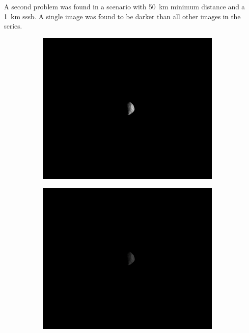 A second problem was found in a scenario with \SI{50}{\kilo\meter} minimum distance and a \SI{1}{\kilo\meter} \gls{sssb}. A single image was found to be darker than all other images in the series.

\begin{figure}[htb]
    \centering
        \begin{subfigure}[b]{0.32\textwidth}
            \centering
            \includegraphics[width=\textwidth]{doc/thesis/0_figures/composition_darkening/50km_Inst_2017-08-15T115816-993000.png}
            \label{fig:composition_dark_1}
        \end{subfigure}
        \begin{subfigure}[b]{0.32\textwidth}
            \centering
            \includegraphics[width=\textwidth]{doc/thesis/0_figures/composition_darkening/Inst_2017-08-15T115818-000000.png}

\end{subfigure}
\end{figure}
